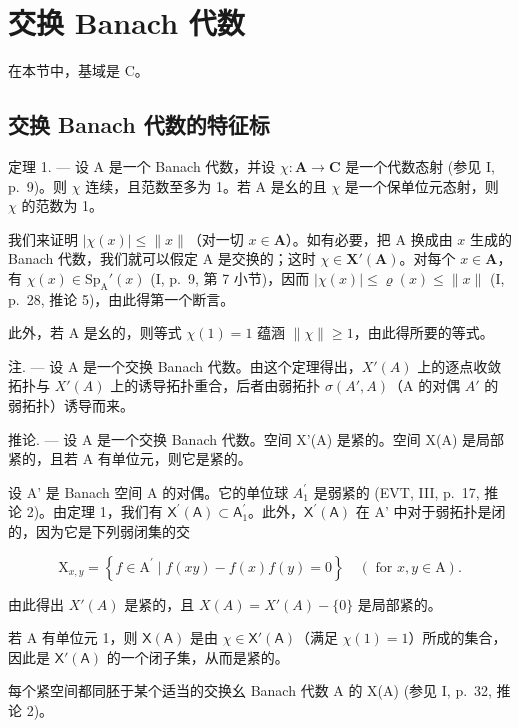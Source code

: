 \section{交换 Banach 代数}

在本节中，基域是 C。

\subsection{交换 Banach 代数的特征标}

定理 1. --- 设 A 是一个 Banach 代数，并设 \(\chi\colon\mathbf{A}\to\mathbf{C}\) 是一个代数态射 (参见 I, p.~9)。则 \(\chi\) 连续，且范数至多为 1。若 A 是幺的且 \(\chi\) 是一个保单位元态射，则 \(\chi\) 的范数为 1。

我们来证明 \(|\chi(x)| \leqslant \|x\|\)（对一切 \(x \in \mathbf{A}\)）。如有必要，把 A 换成由 \(x\) 生成的 Banach 代数，我们就可以假定 A 是交换的；这时 \(\chi \in \mathbf{X}'(\mathbf{A})\)。对每个 \(x \in \mathbf{A}\)，有 \(\chi(x) \in \mathrm{Sp}_{\mathrm{A}}'(x)\) (I, p.~9, 第 7 小节)，因而 \(|\chi(x)| \leqslant \varrho(x) \leqslant \|x\|\) (I, p.~28, 推论 5)，由此得第一个断言。

此外，若 A 是幺的，则等式 \(\chi(1)=1\) 蕴涵 \(\|\chi\|\geqslant1\)，由此得所要的等式。

注. --- 设 A 是一个交换 Banach 代数。由这个定理得出，\(X'(A)\) 上的逐点收敛拓扑与 \(X'(A)\) 上的诱导拓扑重合，后者由弱拓扑 \(\sigma(A', A)\)（A 的对偶 \(A'\) 的弱拓扑）诱导而来。

推论. --- 设 A 是一个交换 Banach 代数。空间 X'(A) 是紧的。空间 X(A) 是局部紧的，且若 A 有单位元，则它是紧的。

设 A' 是 Banach 空间 A 的对偶。它的单位球 \(A_{1}^{\prime}\) 是弱紧的 (EVT, III, p.~17, 推论 2)。由定理 1，我们有 \(\mathsf{X}^{\prime}(\mathsf{A}) \subset \mathsf{A}_{1}^{\prime}\)。此外，\(\mathsf{X}^{\prime}(\mathsf{A})\) 在 A' 中对于弱拓扑是闭的，因为它是下列弱闭集的交

\[
\mathrm{X} _ {x, y} = \left\{f \in \mathrm{A} ^ {\prime} \mid f (x y) - f (x) f (y) = 0 \right\} \quad (\text { for } x, y \in \mathrm{A}).
\]

由此得出 \(X'(A)\) 是紧的，且 \(X(A) = X'(A) - \{0\}\) 是局部紧的。

若 A 有单位元 1，则 \(\mathsf{X}(\mathsf{A})\) 是由 \(\chi \in \mathsf{X}'(\mathsf{A})\)（满足 \(\chi(1) = 1\)）所成的集合，因此是 \(\mathsf{X}'(\mathsf{A})\) 的一个闭子集，从而是紧的。

每个紧空间都同胚于某个适当的交换幺 Banach 代数 A 的 X(A) (参见 I, p.~32, 推论 2)。

